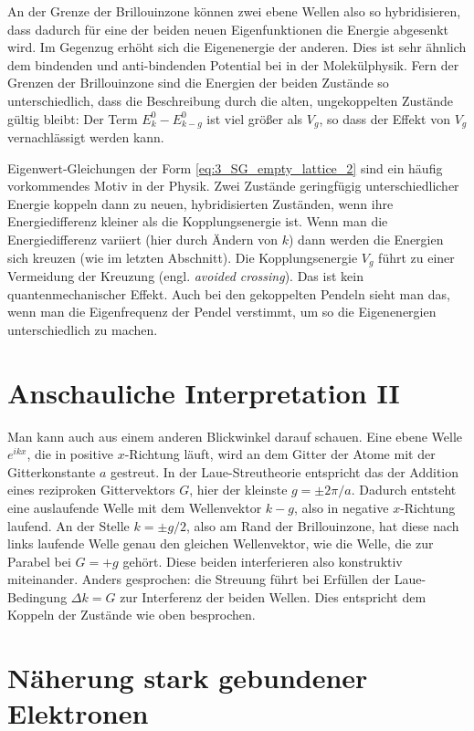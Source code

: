 An der Grenze der Brillouinzone können zwei ebene Wellen also so hybridisieren, dass dadurch für eine der beiden neuen Eigenfunktionen die Energie abgesenkt wird. Im Gegenzug erhöht sich die Eigenenergie der anderen. Dies ist sehr ähnlich dem bindenden und anti-bindenden Potential bei  in der Molekülphysik. Fern der Grenzen der Brillouinzone sind die Energien der beiden Zustände so unterschiedlich, dass die Beschreibung durch die alten, ungekoppelten Zustände gültig bleibt: Der Term $ E_k^0 -   E_{k-g}^0$ ist viel größer als $V_g$, so dass der Effekt von $V_g$ vernachlässigt werden kann.

Eigenwert-Gleichungen der Form \ref{eq:3_SG_empty_lattice_2} sind ein häufig vorkommendes Motiv in der Physik. Zwei Zustände geringfügig unterschiedlicher Energie koppeln dann zu neuen, hybridisierten Zuständen, wenn ihre Energiedifferenz kleiner als die Kopplungsenergie ist. Wenn man die Energiedifferenz variiert (hier durch Ändern von $k$) dann werden die Energien sich kreuzen (wie im letzten Abschnitt). Die Kopplungsenergie $V_g$ führt zu einer Vermeidung der Kreuzung (engl. \emph{avoided crossing}). Das ist kein quantenmechanischer Effekt. Auch bei den gekoppelten Pendeln sieht man das, wenn man die Eigenfrequenz der Pendel verstimmt, um so die Eigenenergien unterschiedlich zu machen.


\section*{Anschauliche Interpretation II}

Man kann auch aus einem anderen Blickwinkel darauf schauen. Eine ebene Welle $e^{i k x}$, die in positive $x$-Richtung läuft, wird an dem Gitter der Atome mit der Gitterkonstante $a$ gestreut.  In der Laue-Streutheorie entspricht das der Addition eines reziproken Gittervektors $G$, hier der kleinste $g = \pm 2 \pi /a$. Dadurch entsteht eine auslaufende Welle mit dem Wellenvektor $k - g$, also in negative $x$-Richtung laufend.  An der Stelle $k = \pm g/2$, also am Rand der Brillouinzone, hat diese nach links laufende Welle genau den gleichen Wellenvektor, wie die Welle, die zur Parabel bei $G=+g$ gehört. Diese beiden interferieren also konstruktiv miteinander. Anders gesprochen: die Streuung führt bei Erfüllen der Laue-Bedingung $\Delta k = G$ zur Interferenz der beiden Wellen. Dies entspricht dem Koppeln der Zustände wie oben besprochen.


\section*{Näherung stark gebundener Elektronen}

